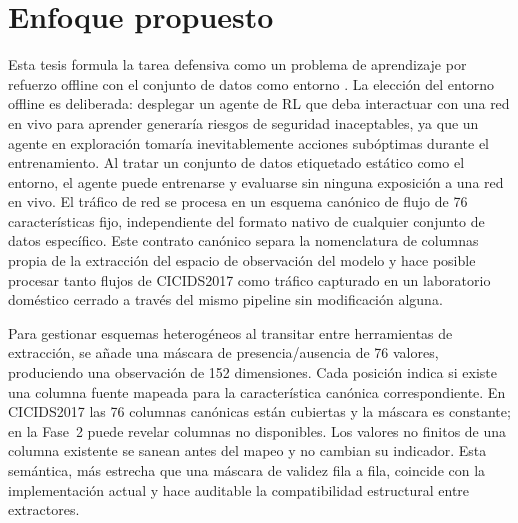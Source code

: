 \section{Enfoque propuesto}
Esta tesis formula la tarea defensiva como un problema de aprendizaje por refuerzo offline con el conjunto de datos como entorno \parencite{Levine2020OfflineRL}. La elección del entorno offline es deliberada: desplegar un agente de RL que deba interactuar con una red en vivo para aprender generaría riesgos de seguridad inaceptables, ya que un agente en exploración tomaría inevitablemente acciones subóptimas durante el entrenamiento. Al tratar un conjunto de datos etiquetado estático como el entorno, el agente puede entrenarse y evaluarse sin ninguna exposición a una red en vivo. El tráfico de red se procesa en un esquema canónico de flujo de 76 características fijo, independiente del formato nativo de cualquier conjunto de datos específico. Este contrato canónico separa la nomenclatura de columnas propia de la extracción del espacio de observación del modelo y hace posible procesar tanto flujos de CICIDS2017 como tráfico capturado en un laboratorio doméstico cerrado a través del mismo pipeline sin modificación alguna.

Para gestionar esquemas heterogéneos al transitar entre herramientas de extracción, se añade una máscara de presencia/ausencia de 76 valores, produciendo una observación de 152 dimensiones. Cada posición indica si existe una columna fuente mapeada para la característica canónica correspondiente. En CICIDS2017 las 76 columnas canónicas están cubiertas y la máscara es constante; en la Fase~2 puede revelar columnas no disponibles. Los valores no finitos de una columna existente se sanean antes del mapeo y no cambian su indicador. Esta semántica, más estrecha que una máscara de validez fila a fila, coincide con la implementación actual y hace auditable la compatibilidad estructural entre extractores.

